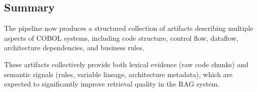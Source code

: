 \documentclass[11pt]{article}
\begin{document}
\subsection*{Summary}

The pipeline now produces a structured collection of artifacts describing multiple aspects of COBOL systems, including code structure, control flow, dataflow, architecture dependencies, and business rules.

These artifacts collectively provide both lexical evidence (raw code chunks) and semantic signals (rules, variable lineage, architecture metadata), which are expected to significantly improve retrieval quality in the RAG system.
\end{document}
